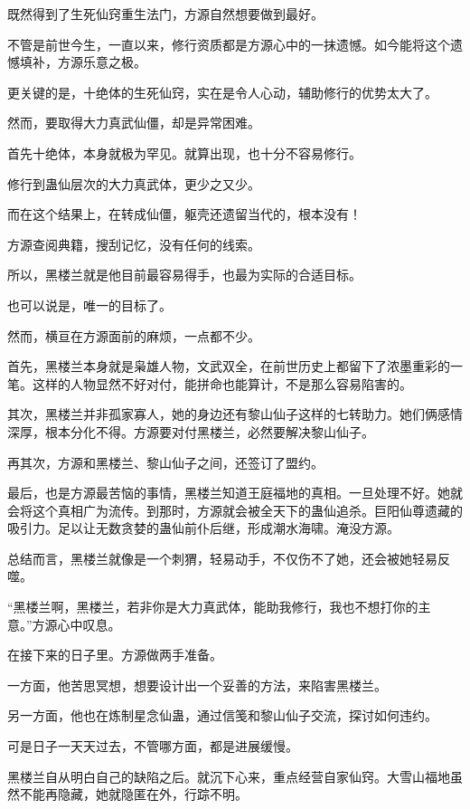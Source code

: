 
\begin{this_body}

既然得到了生死仙窍重生法门，方源自然想要做到最好。

不管是前世今生，一直以来，修行资质都是方源心中的一抹遗憾。如今能将这个遗憾填补，方源乐意之极。

更关键的是，十绝体的生死仙窍，实在是令人心动，辅助修行的优势太大了。

然而，要取得大力真武仙僵，却是异常困难。

首先十绝体，本身就极为罕见。就算出现，也十分不容易修行。

修行到蛊仙层次的大力真武体，更少之又少。

而在这个结果上，在转成仙僵，躯壳还遗留当代的，根本没有！

方源查阅典籍，搜刮记忆，没有任何的线索。

所以，黑楼兰就是他目前最容易得手，也最为实际的合适目标。

也可以说是，唯一的目标了。

然而，横亘在方源面前的麻烦，一点都不少。

首先，黑楼兰本身就是枭雄人物，文武双全，在前世历史上都留下了浓墨重彩的一笔。这样的人物显然不好对付，能拼命也能算计，不是那么容易陷害的。

其次，黑楼兰并非孤家寡人，她的身边还有黎山仙子这样的七转助力。她们俩感情深厚，根本分化不得。方源要对付黑楼兰，必然要解决黎山仙子。

再其次，方源和黑楼兰、黎山仙子之间，还签订了盟约。

最后，也是方源最苦恼的事情，黑楼兰知道王庭福地的真相。一旦处理不好。她就会将这个真相广为流传。到那时，方源就会被全天下的蛊仙追杀。巨阳仙尊遗藏的吸引力。足以让无数贪婪的蛊仙前仆后继，形成潮水海啸。淹没方源。

总结而言，黑楼兰就像是一个刺猬，轻易动手，不仅伤不了她，还会被她轻易反噬。

“黑楼兰啊，黑楼兰，若非你是大力真武体，能助我修行，我也不想打你的主意。”方源心中叹息。

在接下来的日子里。方源做两手准备。

一方面，他苦思冥想，想要设计出一个妥善的方法，来陷害黑楼兰。

另一方面，他也在炼制星念仙蛊，通过信笺和黎山仙子交流，探讨如何违约。

可是日子一天天过去，不管哪方面，都是进展缓慢。

黑楼兰自从明白自己的缺陷之后。就沉下心来，重点经营自家仙窍。大雪山福地虽然不能再隐藏，她就隐匿在外，行踪不明。


\end{this_body}
